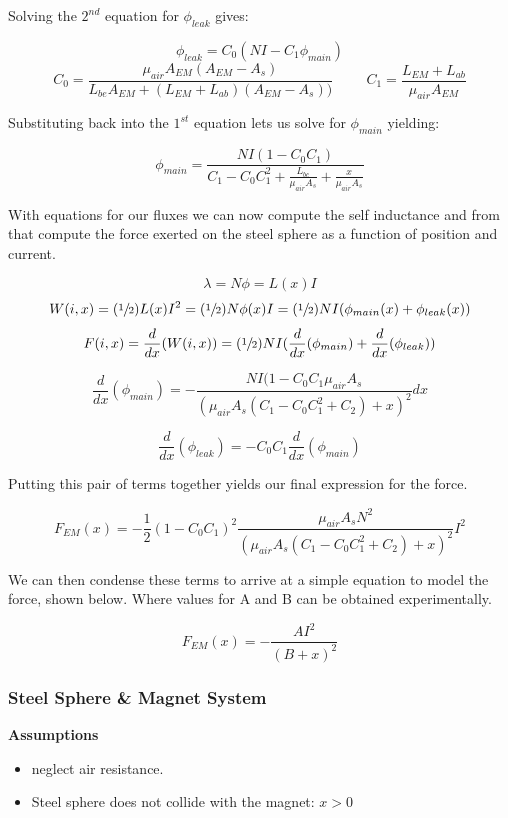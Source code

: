 \documentclass{article}
\theoremstyle{plain}
\theoremstyle{definition}
\theoremstyle{remark}
\begin{document}
Solving the $2^{nd}$ equation for $\phi_{leak}$ gives:

$$\phi_{leak} = C_{0}\left( NI-C_{1}\phi_{main} \right)$$ 
$$C_{0} = \frac{\mu_{air} A_{EM} (A_{EM} - A_{s})}{L_{be} A_{EM} + (L_{EM} + L_{ab})(A_{EM} - A_{s}))} \hspace{1cm} 
C_{1} = \frac{L_{EM} + L_{ab}}{\mu_{air} A_{EM}} $$

Substituting back into the $1^{st}$ equation lets us solve for $\phi_{main}$ yielding: 

$$ \phi_{main} = \frac{NI(1-C_{0}C_{1})}{C_{1} - C_{0} C_{1}^2 + \frac{L_{bc}}{\mu_{air} A_{s}} + \frac{x}{\mu_{air} A_{s}}} $$

With equations for our fluxes we can now compute the self inductance and from that compute the force exerted on the steel sphere as a function of position and current.

$$ \lambda = N \phi = L(x) I $$
$$ W(i,x) = (\sfrac{1}{2}) L(x) I^2 = (\sfrac{1}{2}) N \phi(x) I =(\sfrac{1}{2}) N I (\phi_{main}(x) + \phi_{leak}(x))$$
$$ F(i,x) = \frac{d}{dx} (W(i,x) )= (\sfrac{1}{2}) N I ( \frac{d}{dx} (\phi_{main}) + \frac{d}{dx} (\phi_{leak})) $$

$$ \frac{d}{dx}(\phi_{main}) = - \frac{N I (1 - C_{0}C_{1} \mu_{air} A_{s}}{(\mu_{air} A_{s}(C_{1} - C_{0} C_{1}^2 + C_{2}) + x)^2} dx$$

$$ \frac{d}{dx}(\phi_{leak}) = -C_{0} C_{1} \frac{d}{dx}(\phi_{main})$$

Putting this pair of terms together yields our final expression for the force.

$$ F_{EM}(x) = -\frac{1}{2} \left( 1 - C_{0}C_{1} \right)^2 \frac{\mu_{air} A_{s} N^2 }{(\mu_{air} A_{s}(C_{1} - C_{0} C_{1}^2 + C_{2}) + x)^2} I^2 $$

We can then condense these terms to arrive at a simple equation to model the force, shown below.  Where values for A and B can be obtained experimentally.

$$ F_{EM}(x) = -\frac{A I^2}{(B+x)^2} $$

\subsubsection{Steel Sphere \& Magnet System}
\textbf{Assumptions}
\begin{itemize}
\item neglect air resistance.
\item Steel sphere does not collide with the magnet: $x > 0$
\end{itemize}
\end{document}

